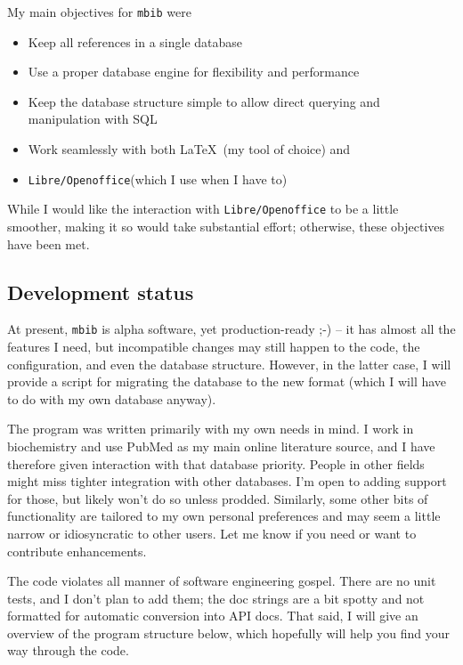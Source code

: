 \documentclass[10pt]{article}
\newcommand*{\mbib}{\texttt{mbib}\xspace}
\newcommand*{\loo}{\texttt{Libre\-/Open\-office}\xspace}
\begin{document}
\medskip

\noindent My main objectives for \mbib were 

\begin{itemize}
\item Keep all references in a single database
\item Use a proper database engine for flexibility and performance
\item Keep the database structure simple to allow direct querying and manipulation with SQL
\item Work seamlessly with both \LaTeX\ (my tool of choice) and 
\item \loo (which I use when I have to) 
\end{itemize}

While I would like the interaction with \loo to be a little smoother, making it so would take substantial effort; otherwise, these objectives have been met.

%

\subsection{Development status}

At present, \mbib is alpha software, yet production-ready ;-) -- it has almost all the features I need, but incompatible changes may still happen to the code, the configuration, and even the database structure. However, in the latter case, I will provide a script for migrating the database to the new format (which I will have to do with my own database anyway). 

The program was written primarily with my own needs in mind. I work in biochemistry and use PubMed as my main online literature source, and I have therefore given interaction with that database priority. People in other fields might miss tighter integration with other databases. I'm open to adding support for those, but likely won't do so unless prodded. Similarly, some other bits of functionality are tailored to my own personal preferences and may seem a little narrow or idiosyncratic to other users. Let me know if you need or want to contribute enhancements. 

The code violates all manner of software engineering gospel. There are no unit tests, and I don't plan to add them; the doc strings are a bit spotty and not formatted for automatic conversion into API docs. That said, I will give an overview of the program structure below, which hopefully will help you find your way through the code. 
\end{document}
